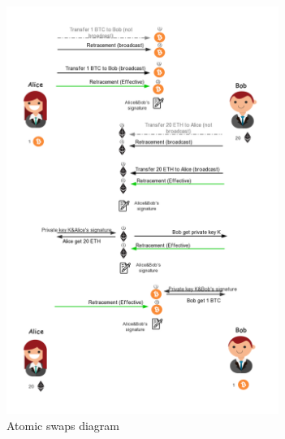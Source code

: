    \begin{figure}[H]
    \includegraphics[width=0.79\textwidth]{./figures/atomic_swaps.png}
	\centering
    \caption{Atomic swaps diagram}%
    \centering
    \label{fig:atomic}
    \end{figure}
